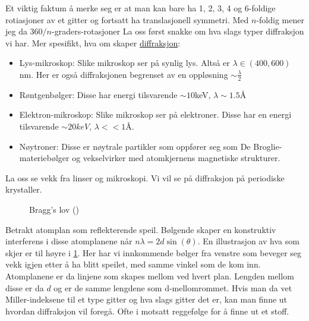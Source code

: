 \documentclass{article}
\begin{document}
Et viktig faktum å merke seg er at man kan bare ha 1, 2, 3, 4 og 6-foldige rotiasjoner av et gitter og fortsatt ha translasjonell symmetri. Med $n$-foldig mener jeg da  $360 / n$-graders-rotasjoner
\nyside
{}
La oss først snakke om  hva slags typer diffraksjon vi har. Mer spesifikt, hva om skaper \underline{diffraksjon}:
\begin{itemize}
    \item Lys-mikroskop: Slike mikroskop ser på synlig lys. Altså er $\lambda \in (400, 600)$ nm. Her er også diffraksjonen begrenset av en oppløsning $\sim \frac{\lambda}{2}$
    \item Røntgenbølger: Disse har energi tilsvarende $\sim 10 $keV, $\lambda \sim 1.5$Å
    \item Elektron-mikroskop: Slike mikroskop ser på elektroner. Disse har en energi tilsvarende $\sim 20 keV$, $\lambda << 1$Å.
    \item Nøytroner: Disse er nøytrale partikler som oppfører seg som De Broglie-materiebølger og vekselvirker med atomkjernens magnetiske strukturer.
\end{itemize}
La oss se vekk fra linser og mikroskopi. Vi vil se på diffraksjon på periodiske krystaller.
\begin{figure}
    \centering
    \caption{Bragg's lov (\cite{Aleksander})}
    \label{fig:braggs_lov}
\end{figure}
Betrakt atomplan som reflekterende speil. Bølgende skaper en konstruktiv interferens i disse atomplanene når $n \lambda = 2d \sin(\theta)$. En illustrasjon av hva som skjer er til høyre i \ref{fig:braggs_lov}. Her har vi innkommende bølger fra venstre som beveger seg vekk igjen etter å ha blitt speilet, med samme vinkel som de kom inn. Atomplanene er da linjene som skapes mellom ved hvert plan. Lengden mellom disse er da $d$ og er de samme lengdene som d-mellomrommet. Hvis man da vet Miller-indeksene til et type gitter og hva slags gitter det er, kan man finne ut hvordan diffraksjon vil foregå. Ofte i motsatt reggefølge for å finne ut et stoff.
\end{document}
